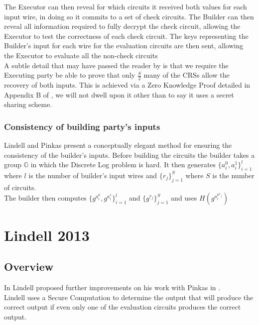 \documentclass[ %
                    author={Nicholas Tutte},
                supervisor={Prof. Nigel Smart},
                    degree={MEng},
                     title={Secure Two Party Computation},
                  subtitle={A practical comparison of recent protocols},
                      type={Research - GG1K},
                      year={2015} ]{dissertation}
\begin{document}
					The Executor can then reveal for which circuits it received both values for each input wire, in doing so it commits to a set of check circuits. The Builder can then reveal all information required to fully decrypt the check circuit, allowing the Executor to test the correctness of each check circuit. The keys representing the Builder's input for each wire for the evaluation circuits are then sent, allowing the Executor to evaluate all the non-check circuits\\

					A subtle detail that may have passed the reader by is that we require the Executing party be able to prove that only $\frac{S}{2}$ many of the CRSs allow the recovery of both inputs. This is achieved via a Zero Knowledge Proof detailed in Appendix B of \cite{LindellAndPinkas2011}, we will not dwell upon it other than to say it uses a secret sharing scheme.

				\subsubsection{Consistency of building party's inputs}
					Lindell and Pinkas present a conceptually elegant method for ensuring the consistency of the builder's inputs. Before building the circuits the builder takes a group $\mathbb{G}$ in which the Discrete Log problem is hard. It then generates $\{a_i^0, a_i^1\}_{i = 1}^{l}$ where $l$ is the number of builder's input wires and $\{r_j\}_{j = 1}^{S}$ where $S$ is the number of circuits.\\

					The builder then computes $\{g^{a_i^0}, g^{a_i^1}\}_{i = 1}^{l}$ and $\{g^{r_j}\}_{j = 1}^{S}$ and uses $H(g^{a_i^0{^{r_j}}})$

		\section{Lindell 2013}
			\subsection*{Overview}

				In \cite{Lindell_CnC_2013} Lindell proposed further improvements on his work with Pinkas in \cite{LindellAndPinkas2011}.\\

				Lindell uses a Secure Computation to determine the output that will produce the correct output if even only one of the evaluation circuits produces the correct output.\\
\end{document}
